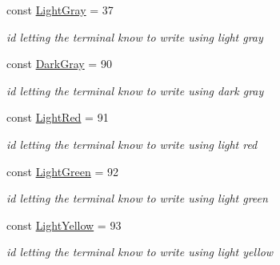 \begin{DoxyCompactItemize}
\mbox{\label{classDisplay_1_1Color_aec8bd907ba4fced890461a63c4cd4636}} 
const \hyperlink{classDisplay_1_1Color_aec8bd907ba4fced890461a63c4cd4636}{Light\+Gray} = 37
\begin{DoxyCompactList}\small\item\em id letting the terminal know to write using light gray \end{DoxyCompactList}\item 
\mbox{\label{classDisplay_1_1Color_a2c7f9964a522e822b13cc9321fdb9869}} 
const \hyperlink{classDisplay_1_1Color_a2c7f9964a522e822b13cc9321fdb9869}{Dark\+Gray} = 90
\begin{DoxyCompactList}\small\item\em id letting the terminal know to write using dark gray \end{DoxyCompactList}\item 
\mbox{\label{classDisplay_1_1Color_a6e33fcb0f0da015e2d7c1bf2e9994341}} 
const \hyperlink{classDisplay_1_1Color_a6e33fcb0f0da015e2d7c1bf2e9994341}{Light\+Red} = 91
\begin{DoxyCompactList}\small\item\em id letting the terminal know to write using light red \end{DoxyCompactList}\item 
\mbox{\label{classDisplay_1_1Color_af745d885e59a992b69ed0155e25375a4}} 
const \hyperlink{classDisplay_1_1Color_af745d885e59a992b69ed0155e25375a4}{Light\+Green} = 92
\begin{DoxyCompactList}\small\item\em id letting the terminal know to write using light green \end{DoxyCompactList}\item 
\mbox{\label{classDisplay_1_1Color_acbc4c132efc5fc18eabc91be7750124f}} 
const \hyperlink{classDisplay_1_1Color_acbc4c132efc5fc18eabc91be7750124f}{Light\+Yellow} = 93
\begin{DoxyCompactList}\small\item\em id letting the terminal know to write using light yellow \end{DoxyCompactList}\item 
\mbox{\label{classDisplay_1_1Color_a2e01836e6c626de1fba9da114c6ec727}} 

\end{DoxyCompactItemize}

